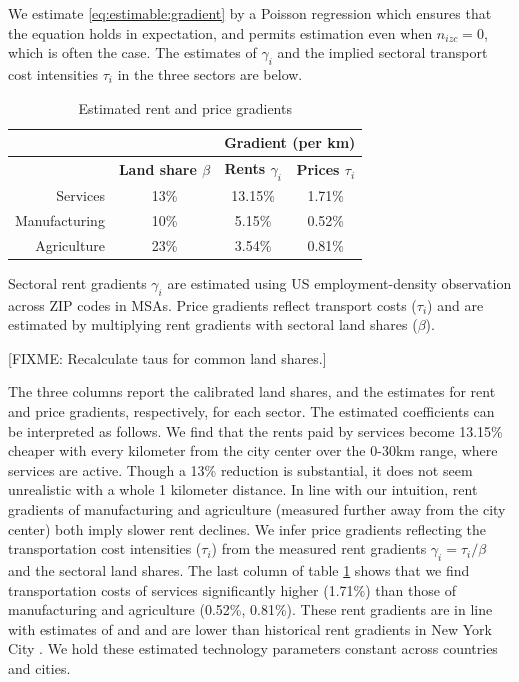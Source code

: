 \documentclass[12pt]{article}
\begin{document}
We estimate \eqref{eq:estimable:gradient} by a Poisson regression which ensures that the equation holds in expectation, and permits estimation even when $n_{izc}=0$, which is often the case. The estimates of $\gamma_i$ and the implied sectoral transport cost intensities $\tau_i$ in the three sectors are below.

\begin{table}[h!]
  \begin{center}
  \caption{Estimated rent and price gradients}
    \begin{tabular}{rccc}
    \toprule
    \textbf{} & \textbf{} & \multicolumn{2}{c}{\textbf{Gradient (per km)}}\\
    \midrule
    \textbf{} & \textbf{Land share $\beta$ } & \textbf{Rents $\gamma_i$} & \textbf{Prices $\tau_i$} \\
    Services & 13\%  & 13.15\% & 1.71\% \\
    Manufacturing & 10\%  & 5.15\% & 0.52\% \\
    Agriculture & 23\%  & 3.54\% & 0.81\% \\
    \bottomrule
    \end{tabular}%

  \end{center}
  \label{tab:EmpGrad}%

  \noindent \footnotesize{Sectoral rent gradients $\gamma_i$ are estimated using US employment-density observation across ZIP codes in MSAs. Price gradients reflect transport costs ($\tau_i$) and are estimated by multiplying rent gradients with sectoral land shares ($\beta$). }
\end{table}%

[FIXME: Recalculate taus for common land shares.]

The three columns report the calibrated land shares, and the estimates for rent and price gradients, respectively, for each sector. The estimated coefficients can be interpreted as follows. We find that the rents paid by services become 13.15\% cheaper with every kilometer from the city center over the 0-30km range, where services are active. Though a 13\% reduction is substantial, it does not seem unrealistic with a whole 1 kilometer distance. In line with our intuition, rent gradients of manufacturing and agriculture (measured further away from the city center) both imply slower rent declines. We infer price gradients reflecting the transportation cost intensities ($\tau_i$) from the measured rent gradients $\gamma_i=\tau_i/\beta$ and the sectoral land shares. The last column of table \ref{tab:EmpGrad} shows that we find transportation costs of services significantly higher (1.71\%) than those of manufacturing and agriculture (0.52\%, 0.81\%). These rent gradients are in line with estimates of  and  and are lower than historical rent gradients in New York City \cite{Atack1998}. We hold these estimated technology parameters constant across countries and cities. 
\end{document}
